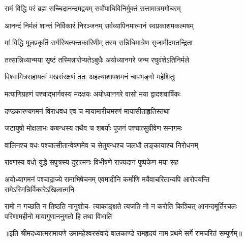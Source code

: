 

\notes{}
\translink{}

\storymeta



\addtocounter{shlokacount}{31}

\twolineshloka
{रामं विद्धि परं ब्रह्म सच्चिदानन्दमद्वयम्}
{सर्वोपाधिविनिर्मुक्तं सत्तामात्रमगोचरम्} %

\twolineshloka
{आनन्दं निर्मलं शान्तं निर्विकारं निरञ्जनम्}
{सर्वव्यापिनमात्मानं स्वप्रकाशमकल्मषम्} %

\twolineshloka
{मां विद्धि मूलप्रकृतिं सर्गस्थित्यन्तकारिणीम्}
{तस्य सन्निधिमात्रेण सृजामीदमतन्द्रिता} %

\twolineshloka
{तत्सान्निध्यान्मया सृष्टं तस्मिन्नारोप्यतेऽबुधैः}
{अयोध्यानगरे जन्म रघुवंशेऽतिनिर्मले} %

\twolineshloka
{विश्वामित्रसहायत्वं मखसंरक्षणं ततः}
{अहल्याशापशमनं चापभङ्गो महेशितुः} %

\twolineshloka
{मत्पाणिग्रहणं पश्चाद्भार्गवस्य मदक्षयः}
{अयोध्यानगरे वासो मया द्वादशवार्षिकः} %

\twolineshloka
{दण्डकारण्यगमनं विराधवध एव च}
{मायामारीचमरणं मायासीताहृतिस्तथा} %

\twolineshloka
{जटायुषो मोक्षलाभः कबन्धस्य तथैव च}
{शबर्याः पूजनं पश्चात्सुग्रीवेण समागमः} %

\twolineshloka
{वालिनश्च वधः पश्चात्सीतान्वेषणमेव च}
{सेतुबन्धश्च जलधौ लङ्कायाश्च निरोधनम्} %

\twolineshloka
{रावणस्य वधो युद्धे सपुत्रस्य दुरात्मनः}
{विभीषणे राज्यदानं पुष्पकेण मया सह} %

\threelineshloka
{अयोध्यागमनं पश्चाद्राज्ये रामाभिषेचनम्}
{एवमादीनि कर्माणि मयैवाचरितान्यपि}
{आरोपयन्ति रामेऽस्मिन्निर्विकारेऽखिलात्मनि} %

\fourlineindentedshloka
{रामो न गच्छति न तिष्ठति नानुशोच-}
{त्याकाङ्क्षते त्यजति नो न करोति किञ्चित्}
{आनन्दमूर्तिरचलः परिणामहीनो}
{मायागुणाननुगतो हि तथा विभाति} %

॥इति श्रीमदध्यात्मरामायणे उमामहेश्वरसंवादे बालकाण्डे रामहृदयं नाम प्रथमे सर्गे रामचरितं सम्पूर्णम्॥

\closesection
